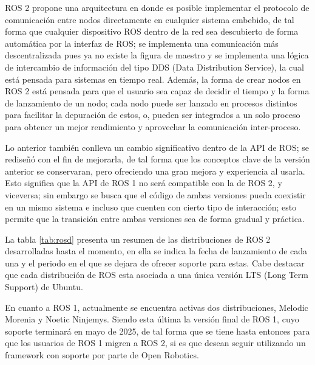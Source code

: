 ROS 2 propone una arquitectura en donde es posible implementar el protocolo de comunicación entre nodos directamente en cualquier sistema embebido, de tal forma que cualquier dispositivo ROS dentro de la red sea descubierto de forma automática por la interfaz de ROS; se implementa una comunicación más descentralizada pues ya no existe la figura de maestro y se implementa una lógica de intercambio de información del tipo DDS (Data Distribution Service), la cual está pensada para sistemas en tiempo real. Además, la forma de crear nodos en ROS 2 está pensada para que el usuario sea capaz de decidir el tiempo  y la forma de lanzamiento de un nodo; cada nodo puede ser lanzado en procesos distintos para facilitar la depuración de estos, o, pueden ser integrados a un solo proceso para obtener un mejor rendimiento y aprovechar la comunicación inter-proceso.  

Lo anterior también conlleva un cambio significativo dentro de la API de ROS; se rediseñó con el fin de mejorarla, de tal forma que los conceptos clave de la versión anterior se conservaran, pero ofreciendo una gran mejora y experiencia al usarla. Esto significa que la API de ROS 1 no será compatible con la de ROS 2, y viceversa; sin embargo se busca que el código de ambas versiones pueda coexistir en un mismo sistema e incluso que cuenten con cierto tipo de interacción; esto permite que la transición entre ambas versiones sea de forma gradual y práctica.

La tabla \ref{tab:rosd} presenta un resumen de las distribuciones de ROS 2 desarrolladas hasta el momento, en ella se indica la fecha de lanzamiento de cada una y el periodo en el que se dejara de ofrecer soporte para estas. Cabe destacar que cada distribución de ROS esta asociada a una única versión LTS (Long Term Support) de Ubuntu.

En cuanto a ROS 1, actualmente se encuentra activas dos distribuciones, Melodic Morenia y Noetic Ninjemys. Siendo esta última la versión final de ROS 1, cuyo soporte terminará en mayo de 2025, de tal forma que se tiene hasta entonces para que los usuarios de ROS 1 migren a ROS 2, si es que desean seguir utilizando un framework con soporte por parte de Open Robotics.

